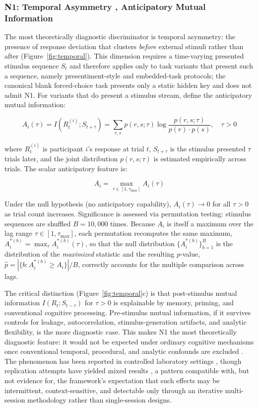 \documentclass[11pt,letterpaper]{article}
\begin{document}
\subsubsection{N1: Temporal Asymmetry , Anticipatory Mutual Information}

The most theoretically diagnostic discriminator is temporal asymmetry: the presence of response deviation that clusters \textit{before} external stimuli rather than after (Figure~\ref{fig:temporal}). This dimension requires a time-varying presented stimulus sequence $S_{t}$ and therefore applies only to task variants that present such a sequence, namely presentiment-style and embedded-task protocols; the canonical blank forced-choice task presents only a static hidden key and does not admit N1. For variants that do present a stimulus stream, define the anticipatory mutual information:

\begin{equation}
A_i(\tau) = I(R_t^{(i)}; S_{t+\tau}) = \sum_{r,s} p(r,s;\tau) \log \frac{p(r,s;\tau)}{p(r) \cdot p(s)}, \quad \tau > 0
\label{eq:ami}
\end{equation}

where $R_t^{(i)}$ is participant $i$'s response at trial $t$, $S_{t+\tau}$ is the stimulus presented $\tau$ trials later, and the joint distribution $p(r,s;\tau)$ is estimated empirically across trials. The scalar anticipatory feature is:

\begin{equation}
A_i = \max_{\tau \in [1, \tau_{\max}]} A_i(\tau)
\end{equation}

Under the null hypothesis (no anticipatory capability), $A_i(\tau) \to 0$ for all $\tau > 0$ as trial count increases. Significance is assessed via permutation testing: stimulus sequences are shuffled $B = 10{,}000$ times. Because $A_i$ is itself a maximum over the lag range $\tau \in [1, \tau_{\max}]$, each permutation recomputes the same maximum, $A_i^{*(b)} = \max_{\tau} A_i^{*(b)}(\tau)$, so that the null distribution $\{A_i^{*(b)}\}_{b=1}^{B}$ is the distribution of the \emph{maximized} statistic and the resulting $p$-value, $\hat{p} = |\{b : A_i^{*(b)} \geq A_i\}| / B$, correctly accounts for the multiple comparison across lags.

The critical distinction (Figure~\ref{fig:temporal}c) is that post-stimulus mutual information $I(R_t; S_{t-\tau})$ for $\tau > 0$ is explainable by memory, priming, and conventional cognitive processing. Pre-stimulus mutual information, if it survives controls for leakage, autocorrelation, stimulus-generation artifacts, and analytic flexibility, is the more diagnostic case. This makes N1 the most theoretically diagnostic feature: it would not be expected under ordinary cognitive mechanisms once conventional temporal, procedural, and analytic confounds are excluded \cite{mossbridge2012,radin2004}. The phenomenon has been reported in controlled laboratory settings \cite{bem2011}, though replication attempts have yielded mixed results \cite{galak2012}, a pattern compatible with, but not evidence for, the framework's expectation that such effects may be intermittent, context-sensitive, and detectable only through an iterative multi-session methodology rather than single-session designs.
\end{document}
